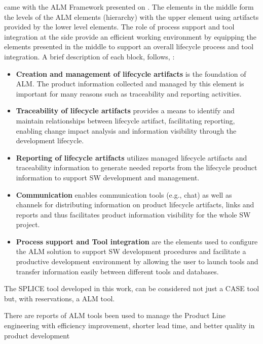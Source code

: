 \cite{kaariainen2011towards} came with the \ac{ALM} Framework presented on . The elements in the middle form the levels of the \ac{ALM} elements (hierarchy) with the upper element using artifacts provided by the lower level elements. The role of process support and tool integration at the side provide an efficient working environment by equipping the elements presented in the middle to support an overall lifecycle process and tool integration. A brief description of each block, follows, \citep{kaariainen2011towards}:

\begin{itemize}

\item  \textbf{Creation and management of lifecycle artifacts} is the foundation of ALM. The product information collected and managed by this element is important for many reasons such as traceability and reporting activities.
\item  \textbf{Traceability of lifecycle artifacts} provides a means to identify and maintain relationships between lifecycle artifact, facilitating reporting, enabling change impact analysis and information visibility through the development lifecycle. 
\item  \textbf{Reporting of lifecycle artifacts} utilizes managed lifecycle artifacts and traceability information to generate needed reports from the lifecycle product information to support SW development and management. 
 \item  \textbf{Communication} enables communication tools (e.g., chat) as well as channels for distributing information on product lifecycle artifacts, links and reports and thus facilitates product information visibility for the whole \ac{SW} project. 
\item  \textbf{Process support and Tool integration} are the elements used to configure the \ac{ALM} solution to support \ac{SW} development procedures and facilitate a productive development environment by allowing the user to launch tools and transfer information easily between different tools and databases.

\end{itemize}

The \acf{SPLICE} tool developed in this work, can be considered not just a \ac{CASE} tool but, with reservations, a \acf{ALM} tool.

There are reports of \acf{ALM} tools been used to manage the Product Line engineering with  efficiency improvement, shorter lead time, and better quality in product development


